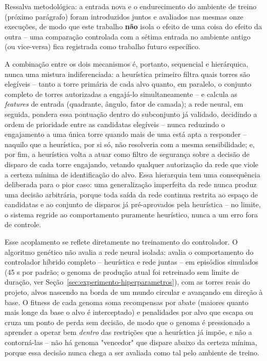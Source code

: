\documentclass[12pt,a4paper]{article}
\begin{document}
Ressalva metodológica: a entrada nova e o endurecimento do ambiente de treino (próximo parágrafo)
foram introduzidos juntos e avaliados nas mesmas onze execuções, de modo que este trabalho
\textbf{não} isola o efeito de uma coisa do efeito da outra -- uma comparação controlada com a
sétima entrada no ambiente antigo (ou vice-versa) fica registrada como trabalho futuro específico.

A combinação entre os dois mecanismos é, portanto, sequencial e hierárquica, nunca uma mistura
indiferenciada: a heurística primeiro filtra quais torres são elegíveis -- tanto a torre primária
de cada alvo quanto, em paralelo, o conjunto completo de torres autorizadas a engajá-lo
simultaneamente -- e calcula as \textit{features} de entrada (quadrante, ângulo, fator de camada);
a rede neural, em seguida, pondera essa pontuação dentro do subconjunto já validado, decidindo a
ordem de prioridade entre as candidatas elegíveis -- nunca reduzindo o engajamento a uma única
torre quando mais de uma está apta a responder -- naquilo que a heurística, por si só, não
resolveria com a mesma sensibilidade; e, por fim, a heurística volta a atuar como filtro de
segurança sobre a decisão de disparo de cada torre engajando, vetando qualquer autorização da rede
que viole a certeza mínima de identificação do alvo. Essa hierarquia
tem uma consequência deliberada para o pior caso: uma generalização
imperfeita da rede nunca produz uma decisão arbitrária, porque toda saída da rede continua restrita
ao espaço de candidatas e ao conjunto de disparos já pré-aprovados pela heurística -- no limite, o
sistema regride ao comportamento puramente heurístico, nunca a um erro fora de controle.

Esse acoplamento se reflete diretamente no treinamento do controlador. O algoritmo genético não
avalia a rede neural isolada: avalia o comportamento do controlador híbrido completo --
heurística e rede juntas -- em episódios simulados (45 s por padrão; o genoma de produção atual foi
retreinado sem limite de duração, ver Seção~\ref{sec:experimento-hiperparametros}), com as torres
reais do projeto, alvos nascendo na borda de um mundo circular e avançando em direção à base. O
fitness de cada genoma soma recompensas por abate (maiores quanto mais longe da base o alvo é
interceptado) e penalidades por alvo que escapa ou cruza um ponto de perda sem decisão, de modo que
o genoma é pressionado a aprender a operar bem \textit{dentro} das restrições que a heurística já
impõe, e não a contorná-las -- não há genoma "vencedor" que dispare abaixo da certeza mínima, porque
essa decisão nunca chega a ser avaliada como tal pelo ambiente de treino.
\end{document}
